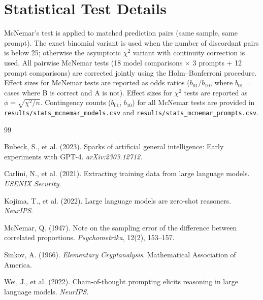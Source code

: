 \documentclass{article}
\begin{document}
\section{Statistical Test Details}
\label{app:stats}

McNemar's test is applied to matched prediction pairs (same sample, same prompt).
The exact binomial variant is used when the number of discordant pairs is below 25;
otherwise the asymptotic $\chi^2$ variant with continuity correction is used.
All pairwise McNemar tests (18 model comparisons $\times$ 3 prompts + 12 prompt
comparisons) are corrected jointly using the Holm--Bonferroni procedure.
Effect sizes for McNemar tests are reported as odds ratios ($b_{01}/b_{10}$,
where $b_{01}$ = cases where B is correct and A is not).
Effect sizes for $\chi^2$ tests are reported as $\phi = \sqrt{\chi^2 / n}$.
Contingency counts ($b_{01}$, $b_{10}$) for all McNemar tests are provided in
\texttt{results/stats\_mcnemar\_models.csv} and \texttt{results/stats\_mcnemar\_prompts.csv}.


\begin{thebibliography}{99}

Bubeck, S., et al. (2023).
Sparks of artificial general intelligence: Early experiments with GPT-4.
\textit{arXiv:2303.12712}.

Carlini, N., et al. (2021).
Extracting training data from large language models.
\textit{USENIX Security}.

Kojima, T., et al. (2022).
Large language models are zero-shot reasoners.
\textit{NeurIPS}.

McNemar, Q. (1947).
Note on the sampling error of the difference between correlated proportions.
\textit{Psychometrika}, 12(2), 153--157.

Sinkov, A. (1966).
\textit{Elementary Cryptanalysis}.
Mathematical Association of America.

Wei, J., et al. (2022).
Chain-of-thought prompting elicits reasoning in large language models.
\textit{NeurIPS}.

\end{thebibliography}
\end{document}
